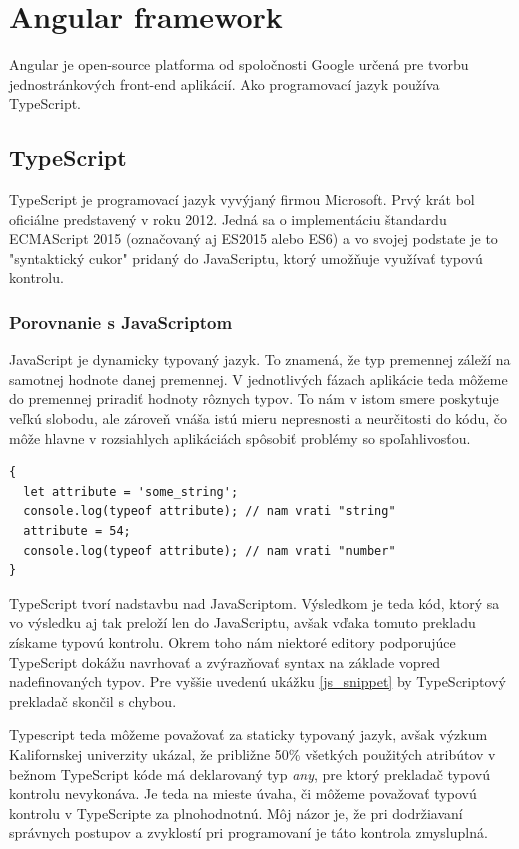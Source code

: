 \documentclass[
  digital, %
  twoside, %
  notable,   %
  nolof,   %
  nolot,   %
]{fithesis3}
\newcommand{\inquotes}[1]{{}"{}#1{}"{}}
\begin{document}
\chapter{Angular framework}
Angular je open-source platforma od spoločnosti Google určená pre tvorbu jednostránkových front-end aplikácií. Ako programovací jazyk používa TypeScript.

\section{TypeScript}
TypeScript je programovací jazyk vyvýjaný firmou Microsoft. Prvý krát bol oficiálne predstavený v roku 2012. Jedná sa o implementáciu štandardu ECMAScript 2015 (označovaný aj ES2015 alebo ES6) a vo svojej podstate je to \inquotes{syntaktický cukor} pridaný do JavaScriptu, ktorý umožňuje využívať typovú kontrolu.

\subsection{Porovnanie s JavaScriptom}
JavaScript je dynamicky typovaný jazyk. To znamená, že typ premennej záleží na samotnej hodnote danej premennej. V jednotlivých fázach aplikácie teda môžeme do premennej priradiť hodnoty rôznych typov. To nám v istom smere poskytuje veľkú slobodu, ale zároveň vnáša istú mieru nepresnosti a neurčitosti do kódu, čo môže hlavne v rozsiahlych aplikáciách spôsobiť problémy so spoľahlivosťou.

\begin{lstlisting}[caption={Kód v JavaScripte},captionpos=b,label=js_snippet]
{
  let attribute = 'some_string';
  console.log(typeof attribute); // nam vrati "string"
  attribute = 54;
  console.log(typeof attribute); // nam vrati "number"
}
\end{lstlisting}

TypeScript tvorí nadstavbu nad JavaScriptom. Výsledkom je teda kód, ktorý sa vo výsledku aj tak preloží len do JavaScriptu, avšak vďaka tomuto prekladu získame typovú kontrolu. Okrem toho nám niektoré editory podporujúce TypeScript dokážu navrhovať a zvýrazňovať syntax na základe vopred nadefinovaných typov. Pre vyššie uvedenú ukážku \ref{js_snippet} by TypeScriptový prekladač skončil s chybou.

Typescript teda môžeme považovať za staticky typovaný jazyk, avšak výzkum Kalifornskej univerzity\cite{ray2014large} ukázal, že približne 50\% všetkých použitých atribútov v bežnom TypeScript kóde má deklarovaný typ \textit{any}, pre ktorý prekladač typovú kontrolu nevykonáva. Je teda na mieste úvaha, či môžeme považovať typovú kontrolu v TypeScripte za plnohodnotnú. Môj názor je, že pri dodržiavaní správnych postupov a zvyklostí pri programovaní je táto kontrola zmysluplná.
\end{document}
